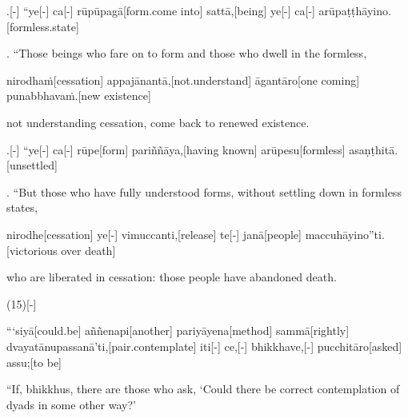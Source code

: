 \vskip 0.2in
\begin{samepage}
.[-] “ye[-] ca[-] rūpūpagā[form.come into] sattā,[being] ye[-] ca[-] arūpaṭṭhāyino.[formless.state]
\endgl
\nopagebreak
\linespread{0.5}
\begin{spacin}{0.2}
{. “Those beings who fare on to form  and those who dwell in the formless,}
\end{spacin}
\vskip 12pt
\end{samepage}
\begin{samepage}
\begingl[glneveryline={\PaliGlossA,\PaliGlossB}]
nirodhaṁ[cessation] appajānantā,[not.understand] āgantāro[one coming] punabbhavaṁ.[new existence]
\endgl
\nopagebreak
\linespread{0.5}
\begin{spacin}{0.2}
{\PaliGlossFT not understanding cessation, come back to renewed existence.}
\end{spacin}
\vskip 12pt
\end{samepage}
\begin{samepage}
.[-] “ye[-] ca[-] rūpe[form] pariññāya,[having known] arūpesu[formless] asaṇṭhitā.[unsettled]
\endgl
\nopagebreak
\linespread{0.5}
\begin{spacin}{0.2}
{. “But those who have fully understood forms, without settling down in formless states,}
\end{spacin}
\vskip 12pt
\end{samepage}
\begin{samepage}
\begingl[glneveryline={\PaliGlossA,\PaliGlossB}]
nirodhe[cessation] ye[-] vimuccanti,[release] te[-] janā[people] maccuhāyino”ti.[victorious over death]
\endgl
\nopagebreak
\linespread{0.5}
\begin{spacin}{0.2}
{\PaliGlossFT who are liberated in cessation: those people have abandoned death.}
\end{spacin}
\vskip 12pt
\end{samepage}
\vskip 0.2in
\begin{samepage}
\begingl[glneveryline={\PaliGlossA,\PaliGlossB}]
(15)[-]
\endgl
\nopagebreak
\linespread{0.5}
\begin{spacin}{0.2}
{}
\end{spacin}
\vskip 12pt
\end{samepage}
\begin{samepage}
\begingl[glneveryline={\PaliGlossA,\PaliGlossB}]
“‘siyā[could.be] aññenapi[another] pariyāyena[method] sammā[rightly] dvayatānupassanā’ti,[pair.contemplate] iti[-] ce,[-] bhikkhave,[-] pucchitāro[asked] assu;[to be]
\endgl
\nopagebreak
\linespread{0.5}
\begin{spacin}{0.2}
{\PaliGlossFT “If, bhikkhus, there are those who ask, ‘Could there be correct contemplation of dyads in some other way?’}
\end{spacin}
\vskip 12pt
\end{samepage}
